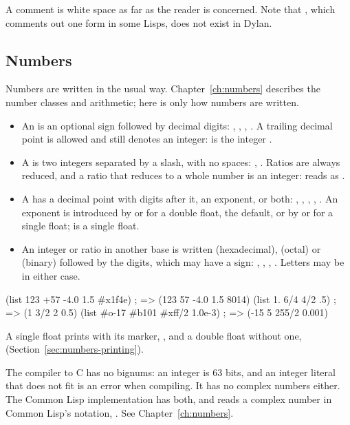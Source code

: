 \noindent A comment is white space as far as the reader is concerned. Note
that \code{\#;}, which comments out one form in some Lisps, does not exist
in Dylan.

\subsection{Numbers}\label{sec:syntax-numbers}

Numbers are written in the usual way. Chapter~\ref{ch:numbers} describes the
number classes and arithmetic; here is only how numbers are written.

\begin{itemize}
\item An  is an optional sign followed by decimal digits:
  , , , . A trailing decimal point is
  allowed and still denotes an integer:  is the integer .
\item A  is two integers separated by a slash, with no spaces:
  , . Ratios are always reduced, and a ratio that
  reduces to a whole number is an integer:  reads as .
\item A  has a decimal point with digits after
  it, an exponent, or both: , , ,
  , . An exponent is introduced by  or
   for a double float, the default, or by  or  for
  a single float;  is a single float.
\item An integer or ratio in another base is written  (hexadecimal),
   (octal) or  (binary) followed by the digits, which
  may have a sign: , , ,
  . Letters may be in either case.
\end{itemize}

\begin{dylan}
(list 123 +57 -4.0 1.5 #x1f4e)     ; => (123 57 -4.0 1.5 8014)
(list 1. 6/4 4/2 .5)               ; => (1 3/2 2 0.5)
(list #o-17 #b101 #xff/2 1.0e-3)   ; => (-15 5 255/2 0.001)
\end{dylan}

\noindent A single float prints with its  marker, ,
and a double float without one, 
(Section~\ref{sec:numbers-printing}).

\begin{warnbox}
The compiler to C has no bignums: an integer is 63 bits, and an integer
literal that does not fit is an error when compiling. It has no complex
numbers either. The Common Lisp implementation has both, and reads a
complex number in Common Lisp's notation, . See
Chapter~\ref{ch:numbers}.
\end{warnbox}

